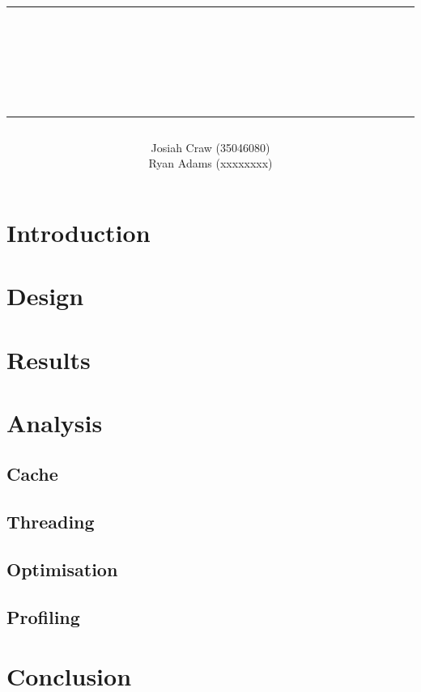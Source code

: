 \documentclass[12pt]{article}
\author{\LARGE Josiah Craw (35046080)\vspace{1cm}\\\LARGE Ryan Adams (xxxxxxxx)\vspace{1cm}\\}
\title{\rule{\textwidth}{0.8pt} \\ {\huge \textbf{\reportTitle}}\\{\large \subTitle} \rule{\textwidth}{0.8pt}}
\begin{document}
\maketitle
\thispagestyle{empty}
\newpage

\section{Introduction}

\section{Design}

\section{Results}

\section{Analysis}

\subsection{Cache}

\subsection{Threading}

\subsection{Optimisation}

\subsection{Profiling}

\section{Conclusion}

\newpage
\medskip


\end{document}
